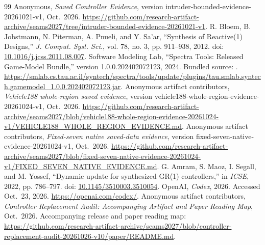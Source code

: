 \documentclass[11pt]{article}
\begin{document}
\begin{thebibliography}{99}
 Anonymous, \emph{Saved Controller Evidence}, version intruder-bounded-evidence-20261021-v1, Oct.~2026. \url{https://github.com/research-artifact-archive/seams2027/tree/intruder-bounded-evidence-20261021-v1}.
R. Bloem, B. Jobstmann, N. Piterman, A. Pnueli, and Y. Sa'ar, ``Synthesis of Reactive(1) Designs,'' \emph{J. Comput. Syst. Sci.}, vol. 78, no. 3, pp. 911--938, 2012. doi: \href{https://doi.org/10.1016/j.jcss.2011.08.007}{10.1016/j.jcss.2011.08.007}.
Software Modeling Lab, ``Spectra Tools: Released Game-Model Bundle,'' version 1.0.0.202402072123, 2024. Bundled source: . \url{https://smlab.cs.tau.ac.il/syntech/spectra/tools/update/plugins/tau.smlab.syntech.gamemodel_1.0.0.202402072123.jar}.
Anonymous artifact contributors, \emph{Vehicle188 whole-region saved evidence}, version vehicle188-whole-region-evidence-20261024-v1, Oct.~2026. \url{https://github.com/research-artifact-archive/seams2027/blob/vehicle188-whole-region-evidence-20261024-v1/VEHICLE188_WHOLE_REGION_EVIDENCE.md}.
Anonymous artifact contributors, \emph{Fixed-seven native saved-data evidence}, version fixed-seven-native-evidence-20261024-v1, Oct.~2026. \url{https://github.com/research-artifact-archive/seams2027/blob/fixed-seven-native-evidence-20261024-v1/FIXED_SEVEN_NATIVE_EVIDENCE.md}.
G. Amram, S. Maoz, I. Segall, and M. Yossef, ``Dynamic update for synthesized GR(1) controllers,'' in \emph{ICSE}, 2022, pp. 786--797. doi: \href{https://doi.org/10.1145/3510003.3510054}{10.1145/3510003.3510054}.
OpenAI, \emph{Codex}, 2026. Accessed Oct.~23, 2026. \url{https://openai.com/codex/}.
Anonymous artifact contributors, \emph{Controller Replacement Audit: Accompanying Artifact and Paper Reading Map}, Oct.~2026. Accompanying release and paper reading map: \url{https://github.com/research-artifact-archive/seams2027/blob/controller-replacement-audit-20261026-v10/paper/README.md}.
\end{thebibliography}
\end{document}
